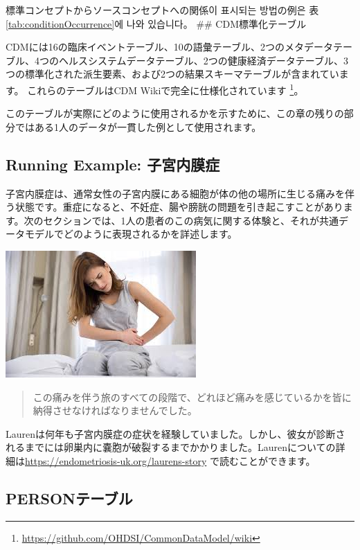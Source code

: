 \documentclass[
  11pt]{book}
\theoremstyle{definition}
\theoremstyle{definition}
\theoremstyle{definition}
\theoremstyle{definition}
\theoremstyle{remark}
\begin{document}
標準コンセプトからソースコンセプトへの関係이 표시되는 방법の例은 表 \ref{tab:conditionOccurrence}에 나와 있습니다。
\#\# CDM標準化テーブル


CDMには16の臨床イベントテーブル、10の語彙テーブル、2つのメタデータテーブル、4つのヘルスシステムデータテーブル、2つの健康経済データテーブル、3つの標準化された派生要素、および2つの結果スキーマテーブルが含まれています。 これらのテーブルはCDM Wikiで完全に仕様化されています \footnote{\url{https://github.com/OHDSI/CommonDataModel/wiki}}。

このテーブルが実際にどのように使用されるかを示すために、この章の残りの部分ではある1人のデータが一貫した例として使用されます。

\subsection{Running Example: 子宮内膜症}\label{running-example-ux5b50ux5baeux5185ux819cux75c7}

子宮内膜症は、通常女性の子宮内膜にある細胞が体の他の場所に生じる痛みを伴う状態です。重症になると、不妊症、腸や膀胱の問題を引き起こすことがあります。次のセクションでは、1人の患者のこの病気に関する体験と、それが共通データモデルでどのように表現されるかを詳述します。

\begin{center}\includegraphics[width=0.5\linewidth]{images/CommonDataModel/Lauren} \end{center}

\begin{quote}
この痛みを伴う旅のすべての段階で、どれほど痛みを感じているかを皆に納得させなければなりませんでした。
\end{quote}

Laurenは何年も子宮内膜症の症状を経験していました。しかし、彼女が診断されるまでには卵巣内に嚢胞が破裂するまでかかりました。Laurenについての詳細は\url{https://endometriosis-uk.org/laurens-story} で読むことができます。

\subsection{PERSONテーブル}\label{person}
\end{document}

